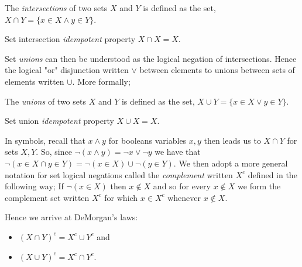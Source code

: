 \begin{defn}
 The \emph{intersections} of two sets $X$ and $Y$ is defined as the set,
 $X \cap Y = \{ x \in X \wedge y \in Y \}$.
\end{defn}

\begin{lem}
 Set intersection \emph{idempotent} property $X \cap X = X$.
\end{lem}

Set \emph{unions} can then be understood as the logical negation of
intersections. Hence the logical "or" disjunction written $\vee$ between
elements to unions between sets of elements written $\cup$. More formally;

\begin{defn}
 The \emph{unions} of two sets $X$ and $Y$ is defined as the set,
 $X \cup Y = \{ x \in X \vee y \in Y \}$.
\end{defn}

\begin{lem}
 Set union \emph{idempotent} property $X \cup X = X$.
\end{lem}

In symbols, recall that $x \wedge y$ for booleans variables $x,y$ then leads us
to $X \cap Y$ for sets $X,Y$. So, since $\neg (x \wedge y)= \neg x \vee \neg y$
we have that $\neg (x \in X \cap y \in Y) = \neg (x \in X) \cup \neg (y \in Y)$.
We then adopt a more general notation for set logical negations called the
\emph{complement} written $X^c$ defined in the following way;
If $\neg (x \in X)$ then $x \not \in X$ and so for every $x \not \in X$ we form
the complement set written $X^c$ for which $x \in X^c$ whenever $x \not \in X$.

Hence we arrive at DeMorgan's laws:
\begin{itemize}
 \item $(X \cap Y)^c = X^c \cup Y^c$ and
 \item $(X \cup Y)^c = X^c \cap Y^c$.
\end{itemize}

